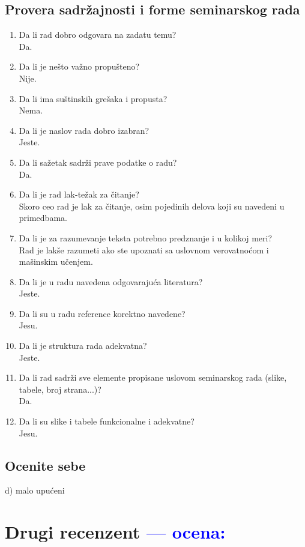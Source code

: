 \documentclass[a4paper]{report}
\newcommand{\odgovor}[1]{\textcolor{blue}{#1}}
\begin{document}
\section{Provera sadržajnosti i forme seminarskog rada}

\begin{enumerate}
\item Da li rad dobro odgovara na zadatu temu?\\
Da.
\item Da li je nešto važno propušteno?\\
Nije.
\item Da li ima suštinskih grešaka i propusta?\\
Nema.
\item Da li je naslov rada dobro izabran?\\
Jeste.
\item Da li sažetak sadrži prave podatke o radu?\\
Da.
\item Da li je rad lak-težak za čitanje?\\
Skoro ceo rad je lak za čitanje, osim pojedinih delova koji su navedeni u primedbama.
\item Da li je za razumevanje teksta potrebno predznanje i u kolikoj meri?\\
Rad je lakše razumeti ako ste upoznati sa uslovnom verovatnoćom i mašinskim učenjem.
\item Da li je u radu navedena odgovarajuća literatura?\\
Jeste.
\item Da li su u radu reference korektno navedene?\\
Jesu.
\item Da li je struktura rada adekvatna?\\
Jeste.
\item Da li rad sadrži sve elemente propisane uslovom seminarskog rada (slike, tabele, broj strana...)?\\
Da.
\item Da li su slike i tabele funkcionalne i adekvatne?\\
Jesu.
\end{enumerate}

\section{Ocenite sebe}
 d) malo upućeni 



\chapter{Drugi recenzent \odgovor{--- ocena:} }
\end{document}
